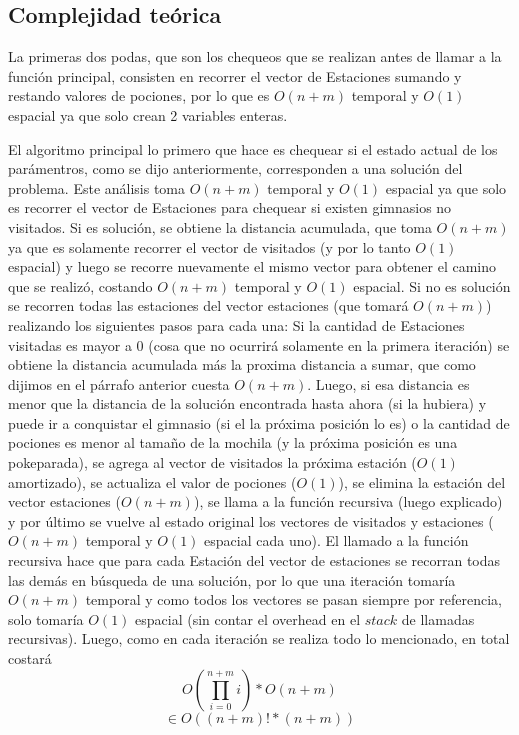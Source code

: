     \subsection{Complejidad teórica}

      La primeras dos podas, que son los chequeos que se realizan antes de llamar a la función principal, consisten en recorrer el vector de Estaciones sumando y restando valores de pociones, por lo que es $O(n+m)$ temporal y $O(1)$ espacial ya que solo crean 2 variables enteras.

      El algoritmo principal lo primero que hace es chequear si el estado actual de los parámentros, como se dijo anteriormente, corresponden a una solución del problema. Este análisis toma $O(n+m)$ temporal y $O(1)$ espacial ya que solo es recorrer el vector de Estaciones para chequear si existen gimnasios no visitados. Si es solución, se obtiene la distancia acumulada, que toma $O(n+m)$ ya que es solamente recorrer el vector de visitados (y por lo tanto $O(1)$ espacial) y luego se recorre nuevamente el mismo vector para obtener el camino que se realizó, costando $O(n+m)$ temporal y $O(1)$ espacial.
      Si no es solución se recorren todas las estaciones del vector estaciones (que tomará $O(n+m)$) realizando los siguientes pasos para cada una: Si la cantidad de Estaciones visitadas es mayor a 0 (cosa que no ocurrirá solamente en la primera iteración) se obtiene la distancia acumulada más la proxima distancia a sumar, que como dijimos en el párrafo anterior cuesta $O(n+m)$. Luego, si esa distancia es menor que la distancia de la solución encontrada hasta ahora (si la hubiera) y puede ir a conquistar el gimnasio (si el la próxima posición lo es) o la cantidad de pociones es menor al tamaño de la mochila (y la próxima posición es una pokeparada), se agrega al vector de visitados la próxima estación ($O(1)$ amortizado), se actualiza el valor de pociones ($O(1)$), se elimina la estación del vector estaciones ($O(n+m)$), se llama a la función recursiva (luego explicado) y por último se vuelve al estado original los vectores de visitados y estaciones ($O(n+m)$ temporal y $O(1)$ espacial cada uno).
      El llamado a la función recursiva hace que para cada Estación del vector de estaciones se recorran todas las demás en búsqueda de una solución, por lo que una iteración tomaría $O(n+m)$ temporal y como todos los vectores se pasan siempre por referencia, solo tomaría $O(1)$ espacial (sin contar el overhead en el $stack$ de llamadas recursivas). Luego, como en cada iteración se realiza todo lo mencionado, en total costará
      \[
        O(\prod_{i=0}^{n+m} i)*O(n+m)
      \]
      \[
        \in O((n+m)! * (n+m))
      \]

